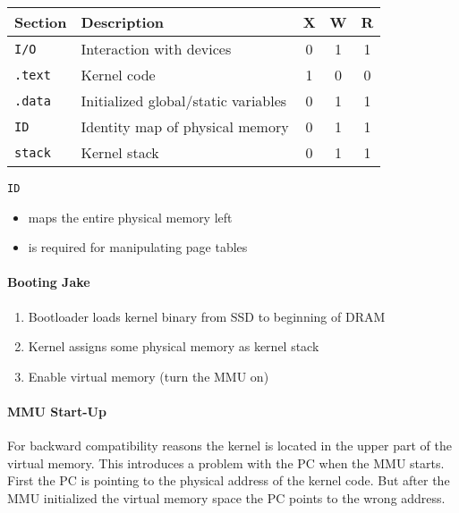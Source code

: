 \renewcommand{\arraystretch}{1.3}
\setlength{\oldtabcolsep}{\tabcolsep}\setlength\tabcolsep{6pt}

\begin{tabularx}{\linewidth}{@{}lXccc@{}}
    Section        & Description                         & X & W & R \\
    \midrule
    \texttt{I/O}   & Interaction with devices            & 0 & 1 & 1 \\
    \texttt{.text} & Kernel code                         & 1 & 0 & 0 \\
    \texttt{.data} & Initialized global/static variables & 0 & 1 & 1 \\
    \texttt{ID}    & Identity map of physical memory     & 0 & 1 & 1 \\
    \texttt{stack} & Kernel stack                        & 0 & 1 & 1
\end{tabularx}

\newpar{}

\texttt{ID}
\begin{itemize}
    \item maps the entire physical memory left
    \item is required for manipulating page tables
\end{itemize}

\renewcommand{\arraystretch}{1}
\setlength\tabcolsep{\oldtabcolsep}

\paragraph{Booting Jake}
\begin{enumerate}
    \item Bootloader loads kernel binary from SSD to beginning of DRAM
    \item Kernel assigns some physical memory as kernel stack
    \item Enable virtual memory (turn the MMU on)
\end{enumerate}

\paragraph{MMU Start-Up}

For backward compatibility reasons the kernel is located in the upper part of the virtual memory. This introduces a problem with the PC when the MMU starts. First the PC is pointing to the physical address of the kernel code. But after the MMU initialized the virtual memory space the PC points to the wrong address.

